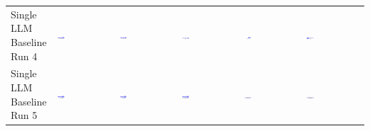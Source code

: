 \begin{table}
\begin{tabularx}{\textwidth}{@{}XXXXXX@{}}
    \makecell{Single LLM \\ Baseline \\ Run 4} & \includegraphics[width=0.13\textwidth]{./run_4/png/gpt-4o_results/Arrow.png} & \includegraphics[width=0.13\textwidth]{./run_4/png/o1-preview_results/Arrow.png} & \includegraphics[width=0.13\textwidth]{./run_4/png/claude-3-5-sonnet-20240620_results/Arrow.png} & \includegraphics[width=0.13\textwidth]{./run_4/png/watsonx_meta-llama_llama-3-1-70b-instruct_results/Arrow.png} & \includegraphics[width=0.13\textwidth]{./run_4/png/watsonx_meta-llama_llama-3-405b-instruct_results/Arrow.png} \\
    \makecell{Single LLM \\ Baseline \\ Run 5} & \includegraphics[width=0.13\textwidth]{./run_5/png/gpt-4o_results/Arrow.png} & \includegraphics[width=0.13\textwidth]{./run_5/png/o1-preview_results/Arrow.png} & \includegraphics[width=0.13\textwidth]{./run_5/png/claude-3-5-sonnet-20240620_results/Arrow.png} & \includegraphics[width=0.13\textwidth]{./run_5/png/watsonx_meta-llama_llama-3-1-70b-instruct_results/Arrow.png} & \includegraphics[width=0.13\textwidth]{./run_5/png/watsonx_meta-llama_llama-3-405b-instruct_results/Arrow.png} \\

\end{tabularx}
\end{table}
